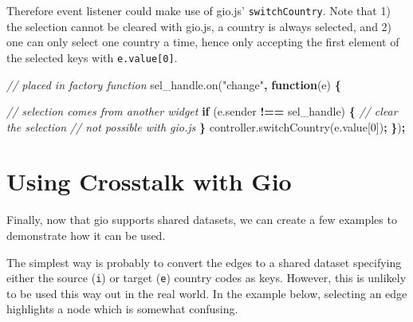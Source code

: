 \documentclass[
  10pt,
]{krantz}
\makeatletter
\newenvironment{Shaded}{\begin{snugshade}}{\end{snugshade}}
\newcommand{\AttributeTok}[1]{\textcolor[rgb]{0.61,0.61,0.61}{#1}}
\newcommand{\CommentTok}[1]{\textcolor[rgb]{0.37,0.37,0.37}{\textit{#1}}}
\newcommand{\ControlFlowTok}[1]{\textcolor[rgb]{0.27,0.27,0.27}{\textbf{#1}}}
\newcommand{\DecValTok}[1]{\textcolor[rgb]{0.06,0.06,0.06}{#1}}
\newcommand{\KeywordTok}[1]{\textcolor[rgb]{0.27,0.27,0.27}{\textbf{#1}}}
\newcommand{\NormalTok}[1]{#1}
\newcommand{\OperatorTok}[1]{\textcolor[rgb]{0.43,0.43,0.43}{\textbf{#1}}}
\newcommand{\StringTok}[1]{\textcolor[rgb]{0.5,0.5,0.5}{#1}}
\newcommand{\VariableTok}[1]{\textcolor[rgb]{0,0,0}{#1}}
\newenvironment{kframe}{%
\medskip{}
\setlength{\fboxsep}{.8em}
 \def\at@end@of@kframe{}%
 \ifinner\ifhmode%
  \def\at@end@of@kframe{\end{minipage}}%
  \begin{minipage}{\columnwidth}%
 \fi\fi%
 \def\FrameCommand##1{\hskip\@totalleftmargin \hskip-\fboxsep
 \colorbox{shadecolor}{##1}\hskip-\fboxsep
     \hskip-\linewidth \hskip-\@totalleftmargin \hskip\columnwidth}%
 \MakeFramed {\advance\hsize-\width
   \@totalleftmargin\z@ \linewidth\hsize
   \@setminipage}}%
 {\par\unskip\endMakeFramed%
 \at@end@of@kframe}
\renewenvironment{Shaded}{\begin{kframe}}{\end{kframe}}
\makeatother
\begin{document}
Therefore event listener could make use of gio.js' \texttt{switchCountry}. Note that 1) the selection cannot be cleared with gio.js, a country is always selected, and 2) one can only select one country a time, hence only accepting the first element of the selected keys with \texttt{e.value{[}0{]}}.

\begin{Shaded}
\begin{Highlighting}[]
\CommentTok{// placed in factory function}
\VariableTok{sel\_handle}\NormalTok{.}\AttributeTok{on}\NormalTok{(}\StringTok{"change"}\OperatorTok{,} \KeywordTok{function}\NormalTok{(e) }\OperatorTok{\{}

  \CommentTok{// selection comes from another widget}
  \ControlFlowTok{if}\NormalTok{ (}\VariableTok{e}\NormalTok{.}\AttributeTok{sender} \OperatorTok{!==}\NormalTok{ sel\_handle) }\OperatorTok{\{}
    \CommentTok{// clear the selection}
    \CommentTok{// not possible with gio.js}
  \OperatorTok{\}}
  \VariableTok{controller}\NormalTok{.}\AttributeTok{switchCountry}\NormalTok{(}\VariableTok{e}\NormalTok{.}\AttributeTok{value}\NormalTok{[}\DecValTok{0}\NormalTok{])}\OperatorTok{;}
\OperatorTok{\}}\NormalTok{)}\OperatorTok{;}
\end{Highlighting}
\end{Shaded}

\hypertarget{linking-widgets-using}{%
\section{Using Crosstalk with Gio}\label{linking-widgets-using}}

Finally, now that gio supports shared datasets, we can create a few examples to demonstrate how it can be used.

The simplest way is probably to convert the edges to a shared dataset specifying either the source (\texttt{i}) or target (\texttt{e}) country codes as keys. However, this is unlikely to be used this way out in the real world. In the example below, selecting an edge highlights a node which is somewhat confusing.
\end{document}
